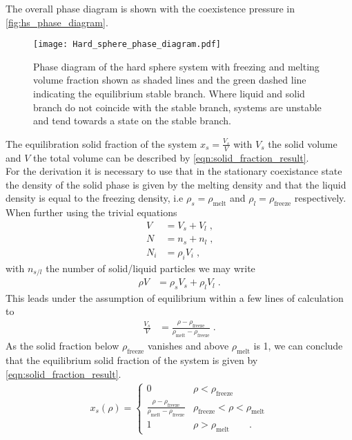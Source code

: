 The overall phase diagram is shown with the coexistence pressure in \autoref{fig:hs_phase_diagram}.\\
\begin{figure}[h]
\centering
\texttt{[image: Hard\_sphere\_phase\_diagram.pdf]}
\caption[Phase diagram of hard sphere fluid]{Phase diagram of the hard sphere system with freezing and melting volume fraction shown as shaded lines and the green dashed line indicating the equilibrium stable branch. Where liquid and solid branch do not coincide with the stable branch, systems are unstable and tend towards a state on the stable branch.}
\label{fig:hs_phase_diagram}
\end{figure}
The equilibration solid fraction of the system $x_s = \frac{V_s}{V}$ with $V_s$ the solid volume and $V$ the total volume can be described by \autoref{eqn:solid_fraction_result}.\\ 
For the derivation it is necessary to use that in the stationary coexistance state the density of the solid phase is given by the melting density and that the liquid density is equal to the freezing density, i.e $\rho_s = \rho_{\text{melt}}$ and $\rho_l = \rho_{\text{freeze}}$ respectively. When further using the trivial equations
\begin{align}
V &= V_s + V_l \; \text{,} \nonumber\\
N &= n_s + n_l \; \text{,} \nonumber\\
N_i &= \rho_i V_i \; \text{,} 
\end{align}
with $n_{s/l}$ the number of solid/liquid particles we may write
\begin{align}
\rho V &= \rho_s V_s + \rho_l V_l \; \text{.}
\end{align}
This leads under the assumption of equilibrium within a few lines of calculation to 
\begin{align}
\frac{V_s}{V} &= \frac{\rho - \rho_{\text{freeze}}}{\rho_{\text{melt}} - \rho_{\text{freeze}} } \; \text{.}
\end{align}
As the solid fraction below $\rho_{\text{freeze}} $ vanishes and above $\rho_{\text{melt}}$ is 1, we can conclude that the equilibrium solid fraction of the system is given by \autoref{eqn:solid_fraction_result}.
\begin{align}
\label{eqn:solid_fraction_result}
x_s(\rho) = 
\begin{cases}
0 & \rho <  \rho_{\text{freeze}}\\
\frac{\rho-\rho_{\text{freeze}}}{\rho_{\text{melt}}-\rho_{\text{freeze}}} &  \rho_{\text{freeze}} < \rho <  \rho_{\text{melt}}\\ 
1 &  \rho > \rho_{\text{melt}} \quad \quad \text{.}
\end{cases}
\end{align}


